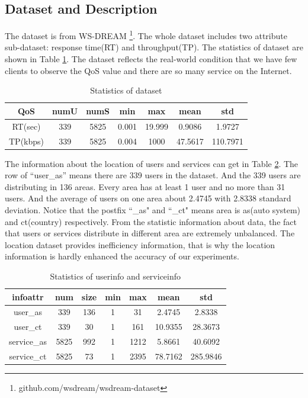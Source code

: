 \documentclass[conference]{IEEEtran}
\begin{document}
\subsection{Dataset and Description}
The dataset is from WS-DREAM \footnote{github.com/wsdream/wsdream-dataset}. The whole dataset includes two attribute sub-dataset: response time(RT) and throughput(TP). The statistics of dataset are shown in Table \ref{tb1}. The dataset reflects the real-world condition that we have few clients to observe the QoS value and there are so many service on the Internet. 
\begin{table}[H]
\begin{threeparttable}
\caption{Statistics of dataset}
\label{tb1}
\begin{tabular}{c||c|c|c|c|c|c} 
\hline 
QoS & numU & numS & min & max & mean & std \\ 
\hline 
RT(sec) & 339   & 5825  & 0.001 & 19.999 & 0.9086 & 1.9727 \\ 
\hline 
TP(kbps) & 339   & 5825  & 0.004 & 1000  & 47.5617 & 110.7971  \\ 
\hline 
\end{tabular} 
\end{threeparttable}
\end{table}

\par The information about the location of users and services can get in Table \ref{tb2}. The row of ``user\_as'' means there are 339 users in the dataset. And the 339 users are distributing in 136 areas. Every area has at least 1 user and no more than 31 users. And the average of users on one area about 2.4745 with 2.8338 standard deviation. Notice that the postfix ``\_as" and ``\_ct" means area is as(auto system) and ct(country) respectively. From the statistic information about data, the fact that users or services distribute in different area are extremely unbalanced. The location dataset provides inefficiency information, that is why the location information is hardly enhanced the accuracy of our experiments.

\begin{table}[H]
\begin{threeparttable}
\caption{Statistics of userinfo and serviceinfo}
\label{tb2}
\begin{tabular}{c||c|c||c|c|c|c}
\hline 
infoattr & num & size & min & max & mean & std \\
\hline
user\_as & 339   & 136   & 1     & 31    & 2.4745 & 2.8338 \\
\hline
user\_ct & 339   & 30    & 1     & 161   & 10.9355 & 28.3673 \\
\hline
service\_as & 5825  & 992   & 1     & 1212  & 5.8661 & 40.6092 \\
\hline
service\_ct & 5825  & 73    & 1     & 2395  & 78.7162 & 285.9846 \\
\hline
\end{tabular} 
\end{threeparttable}
\end{table}
\end{document}
